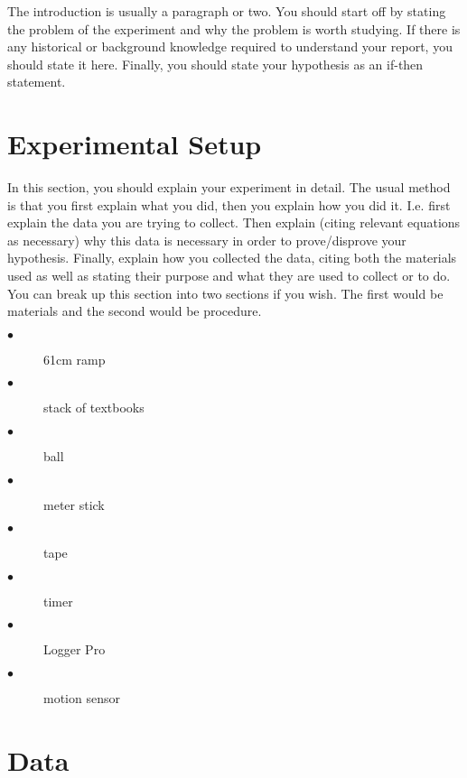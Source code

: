 \documentclass[12pt]{article}
\begin{document}
    The introduction is usually a  paragraph or two. You should start off by stating the problem of the experiment and why the problem is worth studying. If there is any historical or background knowledge required to understand your report, you should state it here. Finally, you should state your hypothesis as an if-then statement. \cite{1}
    
    

    
\section{Experimental Setup}
	In this section, you should explain your experiment in detail. The usual method is that you first explain what you did, then you explain how you did it. I.e. first explain the data you are trying to collect. Then explain (citing relevant equations as necessary) why this data is necessary in order to prove/disprove your hypothesis. Finally, explain how you collected the data, citing both the materials used as well as stating their purpose and what they are used to collect or to do. You can break up this section into two sections if you wish. The first would be materials and the second would be procedure. 

\begin{description}
  \item[$\bullet$] 61cm ramp
  \item[$\bullet$] stack of textbooks
  \item[$\bullet$] ball
  \item[$\bullet$] meter stick
  \item[$\bullet$] tape
  \item[$\bullet$] timer
  \item[$\bullet$] Logger Pro
  \item[$\bullet$] motion sensor
\end{description}


\section{Data}
\end{document}
